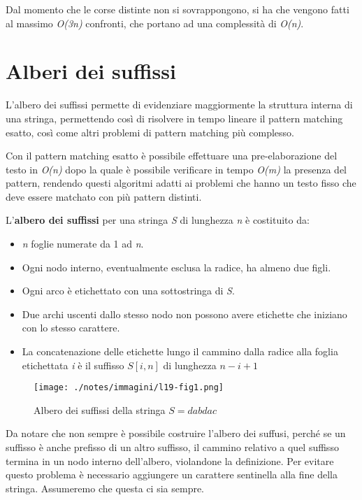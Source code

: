 Dal momento che le corse distinte non si sovrappongono, si ha che vengono fatti al massimo \emph{O(3n)} confronti, che portano ad una complessità di \emph{O(n)}.

\section{Alberi dei suffissi}\label{alberi-dei-suffissi}

L'albero dei suffissi permette di evidenziare maggiormente la struttura interna di una stringa, permettendo così di risolvere in tempo lineare il pattern matching esatto, così come altri problemi di pattern matching più complesso.

Con il pattern matching esatto è possibile effettuare una pre-elaborazione del testo in \emph{O(n)} dopo la quale è possibile verificare in tempo \emph{O(m)} la presenza del pattern, rendendo questi algoritmi adatti ai problemi che hanno un testo fisso che deve essere matchato con più pattern distinti.

L'\textbf{albero dei suffissi} per una stringa \emph{S} di lunghezza \emph{n} è costituito da:

\begin{itemize}
\item  \emph{n} foglie numerate da 1 ad \emph{n}.
\item  Ogni nodo interno, eventualmente esclusa la radice, ha almeno due figli.
\item  Ogni arco è etichettato con una sottostringa di \emph{S}.
\item  Due archi uscenti dallo stesso nodo non possono avere etichette che iniziano con lo stesso carattere.
\item  La concatenazione delle etichette lungo il cammino dalla radice alla foglia etichettata \emph{i} è il suffisso $S[i,n]$ di lunghezza $ n-i+1 $
\end{itemize}

\begin{figure}[htbp]
\centering
\texttt{[image: ./notes/immagini/l19-fig1.png]}
\caption{Albero dei suffissi della stringa $ S = dabdac $}
\end{figure}

Da notare che non sempre è possibile costruire l'albero dei suffusi, perché se un suffisso è anche prefisso di un altro suffisso, il cammino relativo a quel suffisso termina in un nodo interno dell'albero, violandone la definizione. 
Per evitare questo problema è necessario aggiungere un carattere sentinella alla fine della stringa. Assumeremo che questa ci sia sempre.

